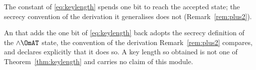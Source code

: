
The constant of \eqref{eq:keylength} spends one bit to reach the accepted
state; the secrecy convention of the derivation it generalises does not
(Remark~\ref{rem:plus2}).

\begin{requirement}\label{req:secrecy-convention}
An  that adds the one bit of \eqref{eq:keylength} back adopts
the secrecy definition of the $\wedge\OmAT$ state, the convention of the
derivation Remark~\ref{rem:plus2} compares, and declares explicitly that it
does so. A key length so obtained is not one of
Theorem~\ref{thm:keylength} and carries no claim of this module.
\end{requirement}
